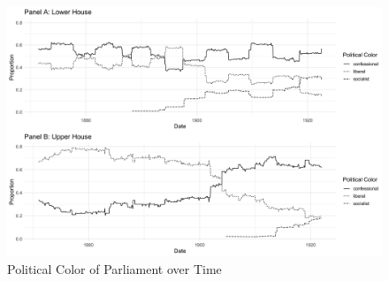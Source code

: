 %
%
\clearpage
\printbibliography

\clearpage





\clearpage


\clearpage


\clearpage


\clearpage

\begin{landscape}

\begin{figure}
    \centering
    \includegraphics[scale=0.17]{figures/step4comp.png}
    \caption{Political Color of Parliament over Time}
    \label{fig:parltime}
\end{figure}

\end{landscape}
\clearpage

